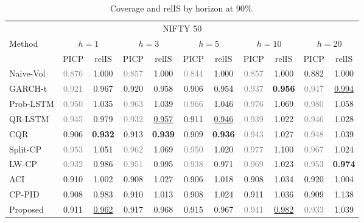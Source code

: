 \begin{table}[!t]\centering\caption{Coverage and relIS by horizon at 90\%.}\label{tab:horizon}
\scriptsize\setlength{\tabcolsep}{2.4pt}
\begin{tabular}{lcccccccccc}\toprule
\multicolumn{11}{c}{NIFTY 50}\\
Method & \multicolumn{2}{c}{$h=1$} & \multicolumn{2}{c}{$h=3$} & \multicolumn{2}{c}{$h=5$} & \multicolumn{2}{c}{$h=10$} & \multicolumn{2}{c}{$h=20$}\\
 & PICP & relIS & PICP & relIS & PICP & relIS & PICP & relIS & PICP & relIS\\\midrule
Naive-Vol & \textcolor{gray}{0.876} & 1.000 & \textcolor{gray}{0.857} & 1.000 & \textcolor{gray}{0.844} & 1.000 & \textcolor{gray}{0.857} & 1.000 & 0.882 & 1.000\\
GARCH-t & \textcolor{gray}{0.921} & 0.967 & 0.920 & 0.958 & 0.906 & 0.954 & \textcolor{gray}{0.937} & \textbf{0.956} & \textcolor{gray}{0.947} & \underline{0.994}\\
Prob-LSTM & \textcolor{gray}{0.950} & 1.035 & \textcolor{gray}{0.963} & 1.039 & \textcolor{gray}{0.966} & 1.046 & \textcolor{gray}{0.976} & 1.069 & \textcolor{gray}{0.980} & 1.058\\
QR-LSTM & \textcolor{gray}{0.945} & 0.979 & \textcolor{gray}{0.932} & \underline{0.957} & 0.911 & \underline{0.946} & \textcolor{gray}{0.939} & 1.022 & \textcolor{gray}{0.946} & 1.028\\
CQR & 0.906 & \textbf{0.932} & 0.913 & \textbf{0.939} & 0.909 & \textbf{0.936} & \textcolor{gray}{0.943} & 1.027 & \textcolor{gray}{0.948} & 1.039\\
Split-CP & \textcolor{gray}{0.953} & 1.051 & \textcolor{gray}{0.962} & 1.069 & \textcolor{gray}{0.950} & 1.020 & \textcolor{gray}{0.977} & 1.100 & \textcolor{gray}{0.967} & 1.024\\
LW-CP & \textcolor{gray}{0.932} & 0.986 & \textcolor{gray}{0.951} & 0.995 & \textcolor{gray}{0.938} & 0.971 & \textcolor{gray}{0.969} & 1.023 & \textcolor{gray}{0.953} & \textbf{0.974}\\
ACI & 0.910 & 1.002 & 0.908 & 1.027 & 0.906 & 1.018 & 0.908 & 1.034 & 0.920 & 1.004\\
CP-PID & 0.908 & 0.983 & 0.910 & 1.013 & 0.908 & 1.024 & 0.911 & 1.036 & 0.909 & 1.138\\
Proposed & 0.911 & \underline{0.962} & 0.917 & 0.968 & 0.915 & 0.967 & \textcolor{gray}{0.941} & \underline{0.982} & \textcolor{gray}{0.933} & 1.039\\
\bottomrule\end{tabular}\\[4pt]

\end{table}

